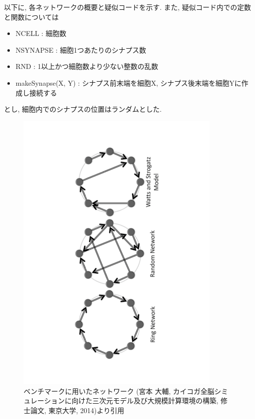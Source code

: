 以下に, 各ネットワークの概要と疑似コードを示す. また, 疑似コード内での定数と関数については
\begin{itemize}
\item NCELL : 細胞数
\item NSYNAPSE : 細胞1つあたりのシナプス数
\item RND : 1以上かつ細胞数より少ない整数の乱数
\item makeSynapse(X, Y) : シナプス前末端を細胞X, シナプス後末端を細胞Yに作成し接続する
\end{itemize}
とし, 細胞内でのシナプスの位置はランダムとした.\\
\clearpage
\begin{figure}[h]
 \begin{center}
    \includegraphics[width=10cm, angle=-90]{./images/bench.pdf}
    \caption[ベンチマークに用いたネットワーク]{ベンチマークに用いたネットワーク (宮本 大輔, カイコガ全脳シミュレーションに向けた三次元モデル及び大規模計算環境の構築, 修士論文, 東京大学, 2014\cite{miyamoto-master})より引用}
    \label{fig:bench-network}
 \end{center}
\end{figure}~\\


